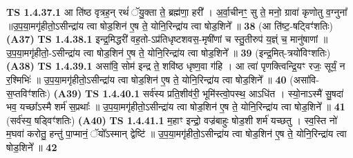 \documentclass[17pt]{extarticle}
\begin{document}
                                        \textbf{ TS 1.4.37.1} \newline
                  आ ति॑ष्ठ वृत्रह॒न् रथं॑ ॅयु॒क्ता ते॒ ब्रह्म॑णा॒ हरी᳚ । अ॒र्वा॒चीनꣳ॒॒ सु ते॒ मनो॒ ग्रावा॑ कृणोतु व॒ग्नुना᳚ ॥उ॒प॒या॒मगृ॑हीतो॒ऽसीन्द्रा॑य त्वा षोड॒शिन॑ ए॒ष ते॒ योनि॒रिन्द्रा॑य त्वा षोड॒शिने᳚ ॥ \textbf{  38} \newline
                  \newline
                      (आ ति॑ष्ट॒-षट्विꣳ॑शतिः)  \textbf{(A37)} \newline \newline
                                        \textbf{ TS 1.4.38.1} \newline
                  इन्द्र॒मिद्धरी॑ वह॒तो-ऽप्र॑तिधृष्टशवस॒-मृषी॑णां च स्तु॒तीरुप॑ य॒ज्ञ्ं च॒ मानु॑षाणां ॥ उ॒प॒या॒मगृ॑हीतो॒-ऽसीन्द्रा॑य त्वा षोड॒शिन॑ ए॒ष ते॒ योनि॒रिन्द्रा॑य त्वा षोड॒शिने᳚ ॥ \textbf{  39 } \newline
                  \newline
                      (इन्द्र॒मित्-त्रयो॑विꣳशतिः)  \textbf{(A38)} \newline \newline
                                        \textbf{ TS 1.4.39.1} \newline
                  असा॑वि॒ सोम॑ इन्द्र ते॒ शवि॑ष्ठ धृष्ण॒वा ग॑हि । आ त्वा॑ पृणक्त्विन्द्रि॒यꣳ रजः॒ सूर्यं॒ न र॒श्मिभिः॑ ॥ उ॒प॒या॒मगृ॑हीतो॒ऽसीन्द्रा॑य त्वा षोड॒शिन॑ ए॒ष ते॒ योनि॒रिन्द्रा॑य त्वा षोड॒शिने᳚ ॥ \textbf{  40 } \newline
                  \newline
                      (असा॑वि-स॒प्तविꣳ॑शतिः)  \textbf{(A39)} \newline \newline
                                        \textbf{ TS 1.4.40.1} \newline
                  सर्व॑स्य प्रति॒शीव॑री॒ भूमि॑स्त्वो॒पस्थ॒ आऽधि॑त । स्यो॒नाऽस्मै॑ सु॒षदा॑ भव॒ यच्छा᳚ऽस्मै शर्म॑ स॒प्रथाः᳚ ॥ उ॒प॒या॒मगृ॑हीतो॒ऽसीन्द्रा॑य त्वा षोड॒शिन॑ ए॒ष ते॒ योनि॒रिन्द्रा॑य त्वा षोड॒शिने᳚ ॥ \textbf{  41} \newline
                  \newline
                      (सर्व॑स्य॒ षड्विꣳ॑शतिः)  \textbf{(A40)} \newline \newline
                                        \textbf{ TS 1.4.41.1} \newline
                  म॒हाꣳ इन्द्रो॒ वज्र॑बाहुः षोड॒शी शर्म॑ यच्छतु । स्व॒स्ति नो॑ म॒घवा॑ करोतु॒ हन्तु॑ पा॒प्मानं॒ ॅयो᳚ऽस्मान् द्वेष्टि॑ ॥ उ॒प॒या॒मगृ॑हीतो॒ऽसीन्द्रा॑य त्वा षोड॒शिन॑ ए॒ष ते॒ योनि॒रिन्द्रा॑य त्वा षोड॒शिने᳚ ॥ \textbf{  42} \newline
\end{document}
